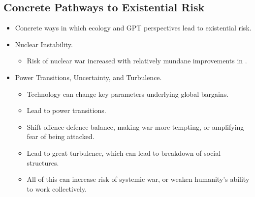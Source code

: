 \subsection{Concrete Pathways to Existential Risk}

\begin{itemize}
    \item Concrete ways in which ecology and GPT perspectives lead to existential risk.
    \item Nuclear Instability.
    \begin{itemize}
        \item Risk of nuclear war increased with relatively mundane improvements in .
    \end{itemize}
    \item Power Transitions, Uncertainty, and Turbulence.
    \begin{itemize}
        \item Technology can change key parameters underlying global bargains.
        \item Lead to power transitions.
        \item Shift offence-defence balance, making war more tempting, or amplifying fear of being attacked.
        \item Lead to great turbulence, which can lead to breakdown of social structures.
        \item All of this can increase risk of systemic war, or weaken humanity's ability to work collectively.
    \end{itemize}
\end{itemize}